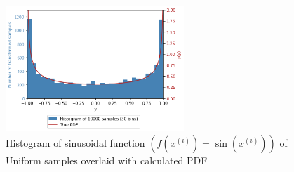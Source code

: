 \documentclass[a4paper]{article}
\begin{document}
\begin{figure}[h]
    \centering
    \includegraphics[width=0.6\textwidth]{figures/sinusoidal_function_of_uniform.png}
    \caption{Histogram of sinusoidal function $\left(f(x^{(i)}) = \sin\left(x^{(i)}\right)\right)$ of Uniform samples
    overlaid with calculated PDF}
    \label{fig:sinusoidal_function_of_uniform}
\end{figure}

\end{document}
